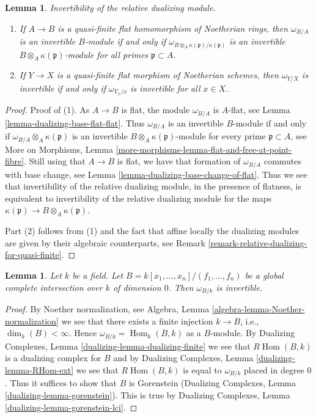 \documentclass[10pt,a4paper]{amsart}
\theoremstyle{plain}
\newtheorem{lemma}[subsection]{Lemma}
\theoremstyle{definition}
\theoremstyle{remark}
\numberwithin{equation}{subsection}
\def\Hom{\mathop{\mathrm{Hom}}\nolimits}
\begin{document}
\begin{lemma}
\label{lemma-characterize-invertible}
Invertibility of the relative dualizing module.
\begin{enumerate}
\item If $A \to B$ is a quasi-finite flat homomorphism of Noetherian rings,
then $\omega_{B/A}$ is an invertible $B$-module if and only if
$\omega_{B \otimes_A \kappa(\mathfrak p)/\kappa(\mathfrak p)}$
is an invertible $B \otimes_A \kappa(\mathfrak p)$-module
for all primes $\mathfrak p \subset A$.
\item If $Y \to X$ is a quasi-finite flat morphism of
Noetherian schemes, then $\omega_{Y/X}$ is invertible
if and only if $\omega_{Y_x/x}$ is invertible for all $x \in X$.
\end{enumerate}
\end{lemma}

\begin{proof}
Proof of (1). As $A \to B$ is flat, the module
$\omega_{B/A}$ is $A$-flat, see Lemma \ref{lemma-dualizing-base-flat-flat}.
Thus $\omega_{B/A}$ is an invertible $B$-module if and only if
$\omega_{B/A} \otimes_A \kappa(\mathfrak p)$
is an invertible $B \otimes_A \kappa(\mathfrak p)$-module for
every prime $\mathfrak p \subset A$, see More on Morphisms, Lemma
\ref{more-morphisms-lemma-flat-and-free-at-point-fibre}.
Still using that $A \to B$ is flat, we have that
formation of $\omega_{B/A}$ commutes with base change, see
Lemma \ref{lemma-dualizing-base-change-of-flat}.
Thus we see that invertibility of the relative dualizing module,
in the presence of flatness, is equivalent to invertibility
of the relative dualizing module for the maps
$\kappa(\mathfrak p) \to B \otimes_A \kappa(\mathfrak p)$.

\medskip\noindent
Part (2) follows from (1) and the fact that affine locally
the dualizing modules are given by their algebraic counterparts, see
Remark \ref{remark-relative-dualizing-for-quasi-finite}.
\end{proof}

\begin{lemma}
\label{lemma-dim-zero-global-complete-intersection-over-field}
Let $k$ be a field. Let $B = k[x_1, \ldots, x_n]/(f_1, \ldots, f_n)$
be a global complete intersection over $k$ of dimension $0$.
Then $\omega_{B/k}$ is invertible.
\end{lemma}

\begin{proof}
By Noether normalization, see
Algebra, Lemma \ref{algebra-lemma-Noether-normalization}
we see that there exists a finite injection $k \to B$, i.e.,
$\dim_k(B) < \infty$. Hence $\omega_{B/k} = \Hom_k(B, k)$
as a $B$-module.
By Dualizing Complexes, Lemma \ref{dualizing-lemma-dualizing-finite}
we see that $R\Hom(B, k)$ is a dualizing complex for $B$
and by Dualizing Complexes, Lemma \ref{dualizing-lemma-RHom-ext}
we see that $R\Hom(B, k)$ is equal to $\omega_{B/k}$
placed in degree $0$. Thus it suffices to show that
$B$ is Gorenstein
(Dualizing Complexes, Lemma \ref{dualizing-lemma-gorenstein}).
This is true by Dualizing Complexes, Lemma
\ref{dualizing-lemma-gorenstein-lci}.
\end{proof}
\end{document}
